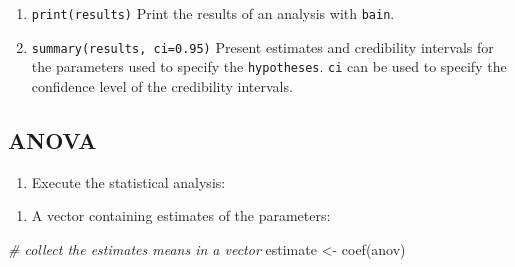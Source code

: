 \documentclass[
]{book}
\newenvironment{Shaded}{\begin{snugshade}}{\end{snugshade}}
\newcommand{\CommentTok}[1]{\textcolor[rgb]{0.56,0.35,0.01}{\textit{#1}}}
\newcommand{\DecValTok}[1]{\textcolor[rgb]{0.00,0.00,0.81}{#1}}
\newcommand{\FunctionTok}[1]{\textcolor[rgb]{0.00,0.00,0.00}{#1}}
\newcommand{\NormalTok}[1]{#1}
\newcommand{\OtherTok}[1]{\textcolor[rgb]{0.56,0.35,0.01}{#1}}
\newcommand{\SpecialCharTok}[1]{\textcolor[rgb]{0.00,0.00,0.00}{#1}}
\providecommand{\tightlist}{%
  \setlength{\itemsep}{0pt}\setlength{\parskip}{0pt}}
\begin{document}
\begin{enumerate}
\def\labelenumi{\arabic{enumi})}
\setcounter{enumi}{4}
\tightlist
\item
  \texttt{print(results)} Print the results of an analysis with
  \texttt{bain}.
\item
  \texttt{summary(results,\ ci=0.95)} Present estimates and credibility intervals for the parameters used to specify the \texttt{hypotheses}. \texttt{ci} can be used to specify the confidence level of the credibility intervals.
\end{enumerate}

\hypertarget{anova-1}{%
\subsection{ANOVA}\label{anova-1}}

\begin{enumerate}
\def\labelenumi{\arabic{enumi})}
\tightlist
\item
  Execute the statistical analysis:
\end{enumerate}

\begin{Shaded}
\end{Shaded}

\begin{enumerate}
\def\labelenumi{\alph{enumi})}
\tightlist
\item
  A vector containing estimates of the parameters:
\end{enumerate}

\begin{Shaded}
\begin{Highlighting}[]
\CommentTok{\# collect the estimates means in a vector}
\NormalTok{estimate }\OtherTok{\textless{}{-}} \FunctionTok{coef}\NormalTok{(anov)}
\end{Highlighting}
\end{Shaded}
\end{document}
